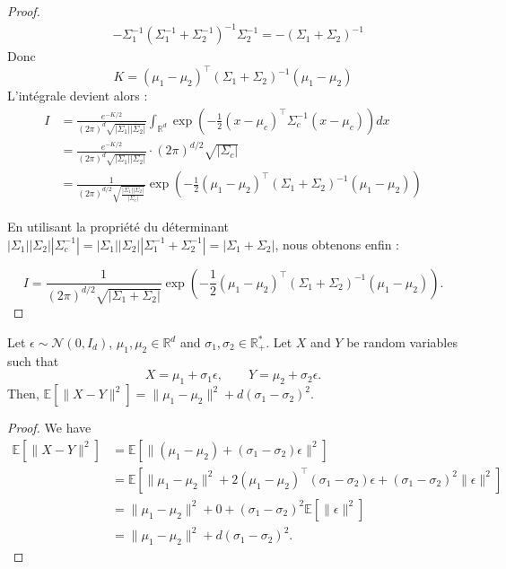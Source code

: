 \documentclass[12pt]{article}
\begin{document}
\begin{proof}
\begin{align*}
& - \Sigma_1^{-1}(\Sigma_1^{-1} + \Sigma_2^{-1})^{-1}\Sigma_2^{-1} = -(\Sigma_1 + \Sigma_2)^{-1}
\end{align*}
Donc 
$$K = (\mu_1 - \mu_2)^\top (\Sigma_1 + \Sigma_2)^{-1} (\mu_1 - \mu_2)$$
L'intégrale devient alors :
\begin{align*}
I &= \frac{e^{-K/2}}{(2\pi)^d \sqrt{|\Sigma_1||\Sigma_2|}} \int_{\mathbb{R}^d} \exp \left( -\frac{1}{2} (x-\mu_c)^\top \Sigma_c^{-1} (x-\mu_c) \right) dx \\
&= \frac{e^{-K/2}}{(2\pi)^d \sqrt{|\Sigma_1||\Sigma_2|}} \cdot (2\pi)^{d/2} \sqrt{|\Sigma_c|} \\
&= \frac{1}{(2\pi)^{d/2} \sqrt{\frac{|\Sigma_1||\Sigma_2|}{|\Sigma_c|}}} \exp \left( -\frac{1}{2} (\mu_1 - \mu_2)^\top (\Sigma_1 + \Sigma_2)^{-1} (\mu_1 - \mu_2) \right)
\end{align*}

En utilisant la propriété du déterminant $|\Sigma_1||\Sigma_2||\Sigma_c^{-1}| = |\Sigma_1||\Sigma_2||\Sigma_1^{-1} + \Sigma_2^{-1}| = |\Sigma_1 + \Sigma_2|$, nous obtenons enfin :

$$I = \frac{1}{(2\pi)^{d/2} \sqrt{|\Sigma_1 + \Sigma_2|}} \exp \left( -\frac{1}{2} (\mu_1 - \mu_2)^\top (\Sigma_1 + \Sigma_2)^{-1} (\mu_1 - \mu_2) \right).$$
\end{proof}

\begin{lemma}
    Let $\epsilon \sim \mathcal{N}(0, I_d)$, $\mu_1, \mu_2 \in \mathbb{R}^d$ 
    and $\sigma_1, \sigma_2 \in \mathbb{R}_+^*$.
    Let $X$ and $Y$ be random variables such that
    $$X = \mu_1 + \sigma_1 \epsilon, \quad \quad Y = \mu_2 + \sigma_2 \epsilon.$$
    Then,
    $\mathbb{E} \left[ \| X - Y \|^2 \right] = \| \mu_1 - \mu_2 \|^2 + d (\sigma_1 - \sigma_2)^2$.
\end{lemma}

\begin{proof}
    We have
    \begin{align*}
        \mathbb{E} \left[ \| X - Y \|^2 \right] 
        & = \mathbb{E} \left[ \| (\mu_1 - \mu_2) + (\sigma_1 - \sigma_2) \epsilon \|^2 \right] \\
        & = \mathbb{E} \left[ \| \mu_1 - \mu_2 \|^2 + 2 (\mu_1 - \mu_2)^\top (\sigma_1 - \sigma_2) \epsilon 
        + (\sigma_1 - \sigma_2)^2 \| \epsilon \|^2 \right] \\
        & = \| \mu_1 - \mu_2 \|^2 + 0 + (\sigma_1 - \sigma_2)^2 \mathbb{E}[\| \epsilon \|^2] \\
        & = \| \mu_1 - \mu_2 \|^2 + d (\sigma_1 - \sigma_2)^2.
    \end{align*}
\end{proof}
\end{document}
